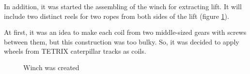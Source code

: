 In addition, it was started the assembling of the winch for extracting lift. It will include two distinct reels for two ropes from both sides of the lift (figure \ref{Winch2.1}). 

At first, it was an idea to make each coil from two middle-sized gears with screws between them, but this construction was too bulky. So, it was decided to apply wheels from TETRIX caterpillar tracks as coils.

\begin{figure}[H]
	\begin{minipage}[h]{1\linewidth}
		\caption{Winch was created}
		\label{Winch2.1}
	\end{minipage}
\end{figure}

